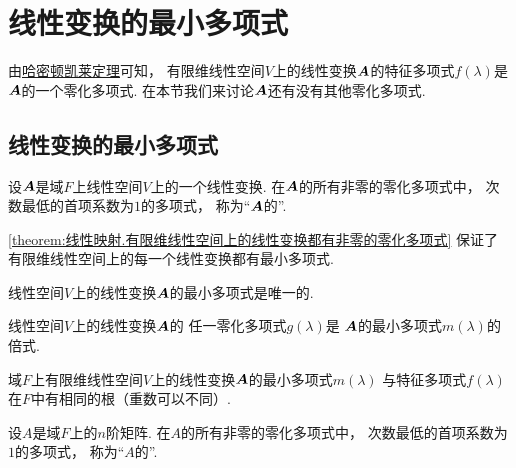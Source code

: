 \section{线性变换的最小多项式}
由\hyperref[theorem:线性映射.哈密顿--凯莱定理2]{哈密顿凯莱定理}可知，
有限维线性空间\(V\)上的线性变换\(\boldsymbol{A}\)的特征多项式\(f(\lambda)\)是\(\boldsymbol{A}\)的一个零化多项式.
在本节我们来讨论\(\boldsymbol{A}\)还有没有其他零化多项式.

\subsection{线性变换的最小多项式}
\begin{definition}
设\(\boldsymbol{A}\)是域\(F\)上线性空间\(V\)上的一个线性变换.
在\(\boldsymbol{A}\)的所有非零的零化多项式中，
次数最低的首项系数为\(1\)的多项式，
称为“\(\boldsymbol{A}\)的”.
\end{definition}
\begin{remark}
\cref{theorem:线性映射.有限维线性空间上的线性变换都有非零的零化多项式}
保证了有限维线性空间上的每一个线性变换都有最小多项式.
\end{remark}

\begin{proposition}
线性空间\(V\)上的线性变换\(\boldsymbol{A}\)的最小多项式是唯一的.
\end{proposition}

\begin{proposition}
线性空间\(V\)上的线性变换\(\boldsymbol{A}\)的
任一零化多项式\(g(\lambda)\)是
\(\boldsymbol{A}\)的最小多项式\(m(\lambda)\)的倍式.
\end{proposition}

\begin{proposition}
域\(F\)上有限维线性空间\(V\)上的线性变换\(\boldsymbol{A}\)的最小多项式\(m(\lambda)\)
与特征多项式\(f(\lambda)\)
在\(F\)中有相同的根（重数可以不同）.
\end{proposition}

\begin{definition}
设\(A\)是域\(F\)上的\(n\)阶矩阵.
在\(A\)的所有非零的零化多项式中，
次数最低的首项系数为\(1\)的多项式，
称为“\(A\)的”.
\end{definition}

